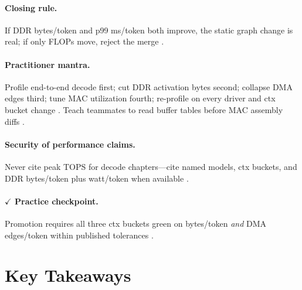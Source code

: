 \paragraph{Closing rule.}
If DDR bytes/token and p99 ms/token both improve, the static graph change is real; if only FLOPs move, reject the merge \citep{memoryfloor2026,taxbreak2026}.

\paragraph{Practitioner mantra.}
Profile end-to-end decode first; cut DDR activation bytes second; collapse DMA edges third; tune MAC utilization fourth; re-profile on every driver and ctx bucket change \citep{taxbreak2026,memoryfloor2026,patel2025llminference,amd2024xdna,yirage2026}.
Teach teammates to read buffer tables before MAC assembly diffs \citep{chen2020compilerbasedhardw,amd2024aie}.

\paragraph{Security of performance claims.}
Never cite peak TOPS for decode chapters---cite named models, ctx buckets, and DDR bytes/token plus watt/token when available \citep{taxbreak2026,memoryfloor2026,dlbook,patel2025llminference,amd2024xdna}.

\paragraph{$\checkmark$ Practice checkpoint.}
Promotion requires all three ctx buckets green on bytes/token \emph{and} DMA edges/token within published tolerances \citep{taxbreak2026,memoryfloor2026,yirage2026,amd2024aie}.

\section{Key Takeaways}
\label{sec:ch05_key_takeaways}

